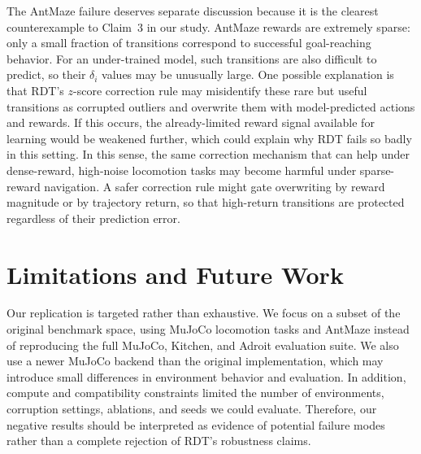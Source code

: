 \documentclass[10pt,twocolumn,letterpaper]{article}
\begin{document}
The AntMaze failure deserves separate discussion because it is the
clearest counterexample to Claim~3 in our study. AntMaze rewards are
extremely sparse: only a small fraction of transitions correspond to
successful goal-reaching behavior. For an under-trained model, such
transitions are also difficult to predict, so their $\delta_i$ values may
be unusually large. One possible explanation is that RDT's $z$-score
correction rule may misidentify these rare but useful transitions as
corrupted outliers and overwrite them with model-predicted actions and
rewards. If this occurs, the already-limited reward signal available for
learning would be weakened further, which could explain why RDT fails so
badly in this setting. In this sense, the same correction mechanism that
can help under dense-reward, high-noise locomotion tasks may become
harmful under sparse-reward navigation. A safer correction rule might
gate overwriting by reward magnitude or by trajectory return, so that
high-return transitions are protected regardless of their prediction
error.

\section{Limitations and Future Work}

Our replication is targeted rather than exhaustive. We focus on a subset
of the original benchmark space, using MuJoCo locomotion tasks and
AntMaze instead of reproducing the full MuJoCo, Kitchen, and Adroit
evaluation suite. We also use a newer MuJoCo backend than the original
implementation, which may introduce small differences in environment
behavior and evaluation. In addition, compute and compatibility
constraints limited the number of environments, corruption settings,
ablations, and seeds we could evaluate. Therefore, our negative results
should be interpreted as evidence of potential failure modes rather than
a complete rejection of RDT's robustness claims.
\end{document}
